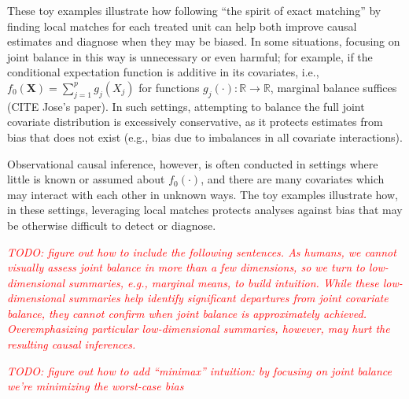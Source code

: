 \documentclass{article}
\newcommand{\bX}{\mathbf{X}}
\newcommand{\note}[1]{\textcolor{red}{\textit{#1}}}
\begin{document}
These toy examples illustrate how following ``the spirit of exact matching'' by finding local matches for each treated unit can help both improve causal estimates and diagnose when they may be biased.
In some situations, focusing on joint balance in this way is unnecessary or even harmful;
for example, if the conditional expectation function is additive in its covariates, i.e., $f_0(\bX) = \sum_{j=1}^p g_j(X_j)$ for functions $g_j(\cdot):\mathbb{R} \to \mathbb{R}$, marginal balance suffices (CITE Jose's paper).
In such settings, attempting to balance the full joint covariate distribution is excessively conservative, as it protects estimates from bias that does not exist (e.g., bias due to imbalances in all covariate interactions).

Observational causal inference, however, is often conducted in settings where little is known or assumed about $f_0(\cdot)$, and there are many covariates which may interact with each other in unknown ways.
The toy examples illustrate how, in these settings, leveraging local matches protects analyses against bias that may be otherwise difficult to detect or diagnose.


\note{TODO: figure out how to include the following sentences.
As humans, we cannot visually assess joint balance in more than a few dimensions, so we turn to low-dimensional summaries, e.g., marginal means, to build intuition.
While these low-dimensional summaries help identify significant departures from joint covariate balance, they cannot confirm when joint balance is approximately achieved.
Overemphasizing particular low-dimensional summaries, however, may hurt the resulting causal inferences.
}

\note{TODO: figure out how to add ``minimax'' intuition: by focusing on joint balance we're minimizing the worst-case bias}


\end{document}
